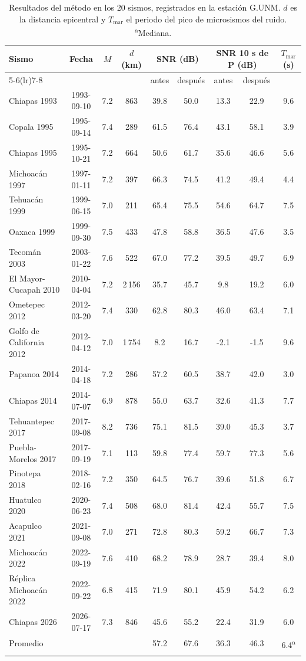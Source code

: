 \begin{longtable}{lcccccccc}
\toprule
Sismo & Fecha & $M$ & $d$ (km) & \multicolumn{2}{c}{SNR (dB)} & \multicolumn{2}{c}{SNR 10 s de P (dB)} & $T_{\text{mar}}$ (s)\\
\cmidrule(lr){5-6}\cmidrule(lr){7-8}
 & & & & antes & después & antes & después & \\
\midrule\endhead
Chiapas 1993 & 1993-09-10 & 7.2 & 863 & 39.8 & 50.0 & 13.3 & 22.9 & 9.6\\
Copala 1995 & 1995-09-14 & 7.4 & 289 & 61.5 & 76.4 & 43.1 & 58.1 & 3.9\\
Chiapas 1995 & 1995-10-21 & 7.2 & 664 & 50.6 & 61.7 & 35.6 & 46.6 & 5.6\\
Michoacán 1997 & 1997-01-11 & 7.2 & 397 & 66.3 & 74.5 & 41.2 & 49.4 & 4.4\\
Tehuacán 1999 & 1999-06-15 & 7.0 & 211 & 65.4 & 75.5 & 54.6 & 64.7 & 7.5\\
Oaxaca 1999 & 1999-09-30 & 7.5 & 433 & 47.8 & 58.8 & 36.5 & 47.6 & 3.5\\
Tecomán 2003 & 2003-01-22 & 7.6 & 522 & 67.0 & 77.2 & 39.5 & 49.7 & 6.9\\
El Mayor-Cucapah 2010 & 2010-04-04 & 7.2 & 2\,156 & 35.7 & 45.7 & 9.8 & 19.2 & 6.0\\
Ometepec 2012 & 2012-03-20 & 7.4 & 330 & 62.8 & 80.3 & 46.0 & 63.4 & 7.1\\
Golfo de California 2012 & 2012-04-12 & 7.0 & 1\,754 & 8.2 & 16.7 & -2.1 & -1.5 & 9.6\\
Papanoa 2014 & 2014-04-18 & 7.2 & 286 & 57.2 & 60.5 & 38.7 & 42.0 & 3.0\\
Chiapas 2014 & 2014-07-07 & 6.9 & 878 & 55.0 & 63.7 & 32.6 & 41.3 & 7.7\\
Tehuantepec 2017 & 2017-09-08 & 8.2 & 736 & 75.1 & 81.5 & 39.0 & 45.3 & 3.7\\
Puebla-Morelos 2017 & 2017-09-19 & 7.1 & 113 & 59.8 & 77.4 & 59.7 & 77.3 & 5.6\\
Pinotepa 2018 & 2018-02-16 & 7.2 & 350 & 64.5 & 76.7 & 39.6 & 51.8 & 6.7\\
Huatulco 2020 & 2020-06-23 & 7.4 & 508 & 68.0 & 81.4 & 42.4 & 55.7 & 7.5\\
Acapulco 2021 & 2021-09-08 & 7.0 & 271 & 72.8 & 80.3 & 59.2 & 66.7 & 7.3\\
Michoacán 2022 & 2022-09-19 & 7.6 & 410 & 68.2 & 78.9 & 28.7 & 39.4 & 8.0\\
Réplica Michoacán 2022 & 2022-09-22 & 6.8 & 415 & 71.9 & 80.1 & 45.9 & 54.2 & 6.2\\
Chiapas 2026 & 2026-07-17 & 7.3 & 846 & 45.6 & 55.2 & 22.4 & 31.9 & 6.0\\
\midrule
Promedio & & & & 57.2 & 67.6 & 36.3 & 46.3 & 6.4\textsuperscript{a}\\
\bottomrule
\caption{Resultados del método en los 20 sismos, registrados en la estación G.UNM. $d$ es la distancia epicentral y $T_{\text{mar}}$ el periodo del pico de microsismos del ruido. \textsuperscript{a}Mediana.}
\label{tab:sismos}
\end{longtable}